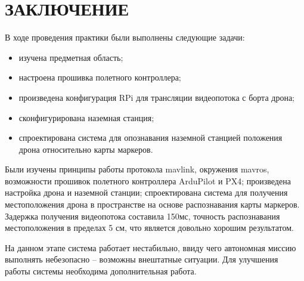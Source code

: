 \documentclass[a4paper,12pt]{article}
\begin{document}
\section*{\centering ЗАКЛЮЧЕНИЕ}
В ходе проведения практики были выполнены следующие задачи:
\begin{itemize} 
	\item изучена предметная область;
	\item настроена прошивка полетного контроллера;
	\item произведена конфигурация RPi для трансляции видеопотока с борта дрона;
	\item сконфигурирована наземная станция;
	\item спроектирована система для опознавания наземной станцией положения дрона относительно карты маркеров.
\end{itemize}

Были изучены принципы работы протокола mavlink, окружения mavros, возможности прошивок полетного контроллера ArduPilot и PX4; произведена настройка дрона и наземной станции; спроектирована система для получения местоположения дрона в пространстве на основе распознавания карты маркеров. Задержка получения видеопотока составила 150мс, точность распознавания местоположения в пределах 5 см, что является довольно хорошим результатом.

На данном этапе система работает нестабильно, ввиду чего автономная миссию выполнять небезопасно -- возможны внештатные ситуации. Для улучшения работы системы необходима дополнительная работа.

\pagebreak

\printbibliography

\pagebreak
\end{document}
